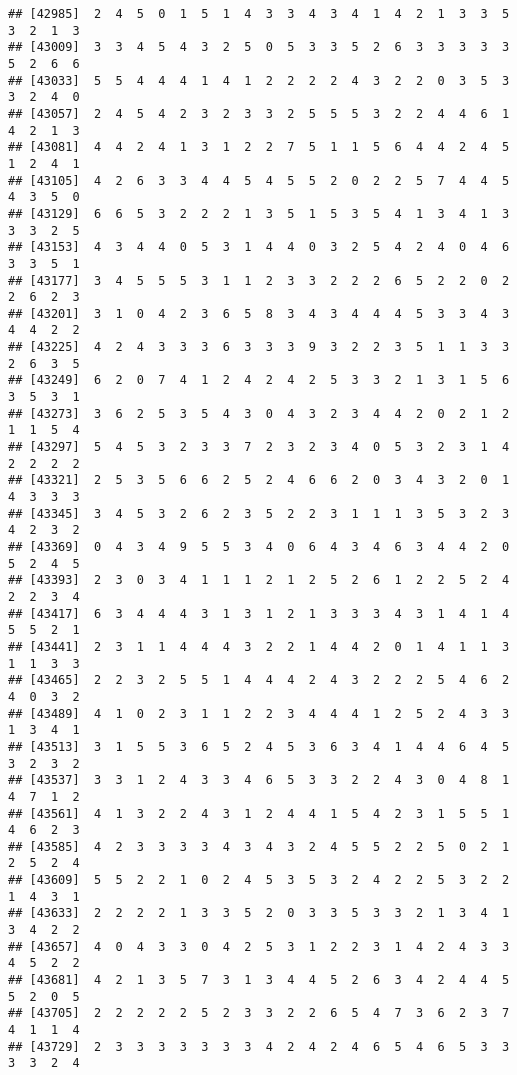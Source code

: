 \documentclass[
]{article}
\begin{document}
\begin{verbatim}
## [42985]  2  4  5  0  1  5  1  4  3  3  4  3  4  1  4  2  1  3  3  5  3  2  1  3
## [43009]  3  3  4  5  4  3  2  5  0  5  3  3  5  2  6  3  3  3  3  3  5  2  6  6
## [43033]  5  5  4  4  4  1  4  1  2  2  2  2  4  3  2  2  0  3  5  3  3  2  4  0
## [43057]  2  4  5  4  2  3  2  3  3  2  5  5  5  3  2  2  4  4  6  1  4  2  1  3
## [43081]  4  4  2  4  1  3  1  2  2  7  5  1  1  5  6  4  4  2  4  5  1  2  4  1
## [43105]  4  2  6  3  3  4  4  5  4  5  5  2  0  2  2  5  7  4  4  5  4  3  5  0
## [43129]  6  6  5  3  2  2  2  1  3  5  1  5  3  5  4  1  3  4  1  3  3  3  2  5
## [43153]  4  3  4  4  0  5  3  1  4  4  0  3  2  5  4  2  4  0  4  6  3  3  5  1
## [43177]  3  4  5  5  5  3  1  1  2  3  3  2  2  2  6  5  2  2  0  2  2  6  2  3
## [43201]  3  1  0  4  2  3  6  5  8  3  4  3  4  4  4  5  3  3  4  3  4  4  2  2
## [43225]  4  2  4  3  3  3  6  3  3  3  9  3  2  2  3  5  1  1  3  3  2  6  3  5
## [43249]  6  2  0  7  4  1  2  4  2  4  2  5  3  3  2  1  3  1  5  6  3  5  3  1
## [43273]  3  6  2  5  3  5  4  3  0  4  3  2  3  4  4  2  0  2  1  2  1  1  5  4
## [43297]  5  4  5  3  2  3  3  7  2  3  2  3  4  0  5  3  2  3  1  4  2  2  2  2
## [43321]  2  5  3  5  6  6  2  5  2  4  6  6  2  0  3  4  3  2  0  1  4  3  3  3
## [43345]  3  4  5  3  2  6  2  3  5  2  2  3  1  1  1  3  5  3  2  3  4  2  3  2
## [43369]  0  4  3  4  9  5  5  3  4  0  6  4  3  4  6  3  4  4  2  0  5  2  4  5
## [43393]  2  3  0  3  4  1  1  1  2  1  2  5  2  6  1  2  2  5  2  4  2  2  3  4
## [43417]  6  3  4  4  4  3  1  3  1  2  1  3  3  3  4  3  1  4  1  4  5  5  2  1
## [43441]  2  3  1  1  4  4  4  3  2  2  1  4  4  2  0  1  4  1  1  3  1  1  3  3
## [43465]  2  2  3  2  5  5  1  4  4  4  2  4  3  2  2  2  5  4  6  2  4  0  3  2
## [43489]  4  1  0  2  3  1  1  2  2  3  4  4  4  1  2  5  2  4  3  3  1  3  4  1
## [43513]  3  1  5  5  3  6  5  2  4  5  3  6  3  4  1  4  4  6  4  5  3  2  3  2
## [43537]  3  3  1  2  4  3  3  4  6  5  3  3  2  2  4  3  0  4  8  1  4  7  1  2
## [43561]  4  1  3  2  2  4  3  1  2  4  4  1  5  4  2  3  1  5  5  1  4  6  2  3
## [43585]  4  2  3  3  3  3  4  3  4  3  2  4  5  5  2  2  5  0  2  1  2  5  2  4
## [43609]  5  5  2  2  1  0  2  4  5  3  5  3  2  4  2  2  5  3  2  2  1  4  3  1
## [43633]  2  2  2  2  1  3  3  5  2  0  3  3  5  3  3  2  1  3  4  1  3  4  2  2
## [43657]  4  0  4  3  3  0  4  2  5  3  1  2  2  3  1  4  2  4  3  3  4  5  2  2
## [43681]  4  2  1  3  5  7  3  1  3  4  4  5  2  6  3  4  2  4  4  5  5  2  0  5
## [43705]  2  2  2  2  2  5  2  3  3  2  2  6  5  4  7  3  6  2  3  7  4  1  1  4
## [43729]  2  3  3  3  3  3  3  3  4  2  4  2  4  6  5  4  6  5  3  3  3  3  2  4

\end{verbatim}
\end{document}
